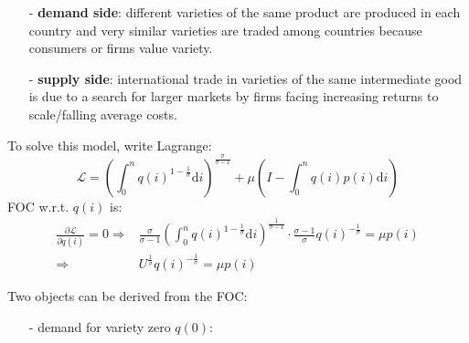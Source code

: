 \documentclass[10pt,landscape,a4paper]{article}
\begin{document}
\begin{multicols*}{4}
\begin{itemize}
    \item[-]\textbf{{\color{myblue}demand side}}: different varieties of the same product are produced in each country and very similar varieties are traded among countries because consumers or firms value variety.
    \item[-]\textbf{{\color{myblue}supply side}}: international trade in varieties of the same intermediate good is due to a search for larger markets by firms facing increasing returns to scale/falling average costs.
\end{itemize}

\vspace{2pt}

\vspace{2pt}
To solve this model, write Lagrange:
$$
\mathcal{L} = \left(\int^n_0 q(i)^{1-\frac{1}{\sigma}}\mathrm{d}i\right)^{\frac{\sigma}{\sigma-1}}+\mu\left( I-\int^n_0q(i)p(i)\mathrm{d}i\right)
$$
FOC w.r.t. $q(i)$ is:
\begin{align*}
    \frac{\partial\mathcal{L}}{\partial q(i)}=0\Rightarrow & \frac{\sigma}{\sigma-1} \left(\int^n_0 q(i)^{1-\frac{1}{\sigma}}\mathrm{d}i\right)^{\frac{1}{\sigma-1}}\cdot\frac{\sigma-1}{\sigma}q(i)^{-\frac{1}{\sigma}}=\mu p(i)\\
    \Rightarrow & U^{\frac{1}{\sigma}}q(i)^{-\frac{1}{\sigma}}=\mu p(i)
\end{align*}

Two objects can be derived from the FOC:
\begin{itemize}
    \item[-] demand for variety zero $q(0)$: 
    

\end{itemize}
\end{multicols*}
\end{document}
